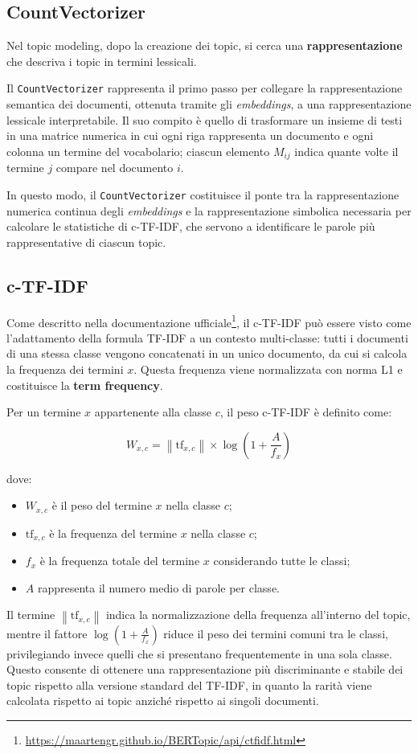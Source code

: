\subsection{CountVectorizer}
Nel topic modeling, dopo la creazione dei topic, si cerca una \textbf{rappresentazione} che descriva i topic in termini lessicali.

Il \texttt{CountVectorizer} rappresenta il primo passo per collegare la rappresentazione semantica dei documenti, ottenuta tramite gli \textit{embeddings}, a una rappresentazione lessicale interpretabile. 
Il suo compito è quello di trasformare un insieme di testi in una matrice numerica in cui ogni riga rappresenta un documento e ogni colonna un termine del vocabolario; ciascun elemento \( M_{ij} \) indica quante volte il termine \( j \) compare nel documento \( i \).

In questo modo, il \texttt{CountVectorizer} costituisce il ponte tra la rappresentazione numerica continua degli \textit{embeddings} e la rappresentazione simbolica necessaria per calcolare le statistiche di c-TF-IDF, che servono a identificare le parole più rappresentative di ciascun topic.
\subsection{c-TF-IDF}
\noindent Come descritto nella documentazione ufficiale\footnote{\url{https://maartengr.github.io/BERTopic/api/ctfidf.html}}, il c-TF-IDF può essere visto come l’adattamento della formula TF-IDF a un contesto multi-classe: tutti i documenti di una stessa classe vengono concatenati in un unico documento, da cui si calcola la frequenza dei termini \(x\). Questa frequenza viene normalizzata con norma L1 e costituisce la \textbf{term frequency}.

Per un termine \( x \) appartenente alla classe \( c \), il peso c-TF-IDF è definito come:

\[
W_{x,c} = \left\| \mathrm{tf}_{x,c} \right\| \times 
\log \!\left( 1 + \frac{A}{f_x} \right)
\]

dove:
\begin{itemize}
    \item \( W_{x, c} \) è il peso del termine \( x\) nella classe \( c \);
    \item \( \mathrm{tf}_{x,c} \) è la frequenza del termine \( x \) nella classe \( c \);
    \item \( f_x \) è la frequenza totale del termine \( x \) considerando tutte le classi;
    \item \( A \) rappresenta il numero medio di parole per classe. 
\end{itemize}
Il termine \( \left\| \mathrm{tf}_{x,c} \right\| \) indica la normalizzazione della frequenza all'interno del topic, mentre il fattore 
\(\log \!\left( 1 + \tfrac{A}{f_x} \right)\) riduce il peso dei termini comuni tra le classi, privilegiando invece quelli che si presentano frequentemente in una sola classe.  
Questo consente di ottenere una rappresentazione più discriminante e stabile dei topic rispetto alla versione standard del TF-IDF, 
in quanto la rarità viene calcolata rispetto ai topic anziché rispetto ai singoli documenti.

